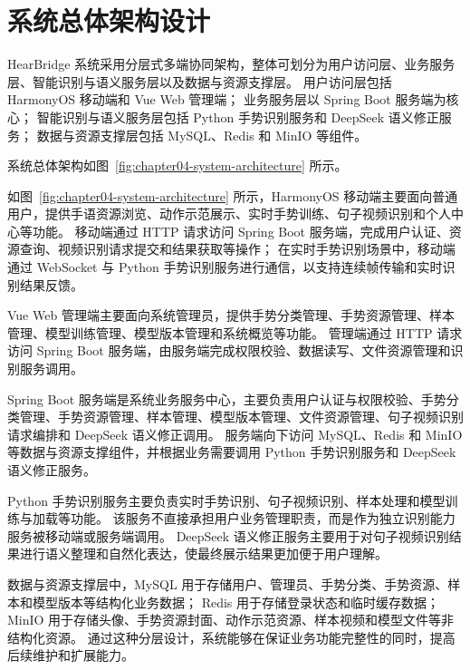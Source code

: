 
\section{系统总体架构设计}

HearBridge 系统采用分层式多端协同架构，整体可划分为用户访问层、业务服务层、智能识别与语义服务层以及数据与资源支撑层。
用户访问层包括 HarmonyOS 移动端和 Vue Web 管理端；
业务服务层以 Spring Boot 服务端为核心；
智能识别与语义服务层包括 Python 手势识别服务和 DeepSeek 语义修正服务；
数据与资源支撑层包括 MySQL、Redis 和 MinIO 等组件。

系统总体架构如图~\ref{fig:chapter04-system-architecture} 所示。


如图~\ref{fig:chapter04-system-architecture} 所示，HarmonyOS 移动端主要面向普通用户，提供手语资源浏览、动作示范展示、实时手势训练、句子视频识别和个人中心等功能。
移动端通过 HTTP 请求访问 Spring Boot 服务端，完成用户认证、资源查询、视频识别请求提交和结果获取等操作；
在实时手势识别场景中，移动端通过 WebSocket 与 Python 手势识别服务进行通信，以支持连续帧传输和实时识别结果反馈。

Vue Web 管理端主要面向系统管理员，提供手势分类管理、手势资源管理、样本管理、模型训练管理、模型版本管理和系统概览等功能。
管理端通过 HTTP 请求访问 Spring Boot 服务端，由服务端完成权限校验、数据读写、文件资源管理和识别服务调用。

Spring Boot 服务端是系统业务服务中心，主要负责用户认证与权限校验、手势分类管理、手势资源管理、样本管理、模型版本管理、文件资源管理、句子视频识别请求编排和 DeepSeek 语义修正调用。
服务端向下访问 MySQL、Redis 和 MinIO 等数据与资源支撑组件，并根据业务需要调用 Python 手势识别服务和 DeepSeek 语义修正服务。

Python 手势识别服务主要负责实时手势识别、句子视频识别、样本处理和模型训练与加载等功能。
该服务不直接承担用户业务管理职责，而是作为独立识别能力服务被移动端或服务端调用。
DeepSeek 语义修正服务主要用于对句子视频识别结果进行语义整理和自然化表达，使最终展示结果更加便于用户理解。

数据与资源支撑层中，MySQL 用于存储用户、管理员、手势分类、手势资源、样本和模型版本等结构化业务数据；
Redis 用于存储登录状态和临时缓存数据；
MinIO 用于存储头像、手势资源封面、动作示范资源、样本视频和模型文件等非结构化资源。
通过这种分层设计，系统能够在保证业务功能完整性的同时，提高后续维护和扩展能力。
